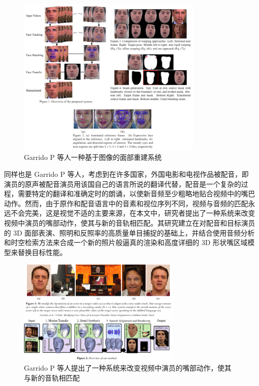 \begin{figure}[htb]
\centering 
\includegraphics[width=0.80\textwidth]{img/ch1m4.png} 
\caption{Garrido P 等人一种基于图像的面部重建系统}
\label{Test}
\end{figure}

同样也是 Garrido P 等人\cite{garrido2015vdub}，考虑到在许多国家，外国电影和电视作品被配音，即演员的原声被配音演员用该国自己的语言所说的翻译代替，配音是一个复杂的过程，需要特定的翻译和准确定时的朗诵，以使新音频至少粗略地贴合视频中的嘴巴动作。然而，由于原作和配音语言中的音素和视位序列不同，视频与音频的匹配永远不会完美，这是视觉不适的主要来源，在本文中，研究者提出了一种系统来改变视频中演员的嘴部动作，使其与新的音轨相匹配。其研究建立在对配音和目标演员的 3D 面部表演、照明和反照率的高质量单目捕捉的基础上，并结合使用音频分析和时空检索方法来合成一个新的照片般逼真的渲染和高度详细的 3D 形状嘴区域模型来替换目标性能。

\begin{figure}[htb]
\centering 
\includegraphics[width=0.70\textwidth]{img/ch1m5.png} 
\caption{Garrido P 等人提出了一种系统来改变视频中演员的嘴部动作，使其与新的音轨相匹配}
\label{Test}
\end{figure}


